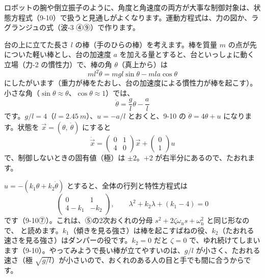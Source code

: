 \label{ph:波-4:sec10}
ロボットの腕や倒立振子のように、角度と角速度の両方が大事な制御対象は、状態方程式（9-10）で扱うと見通しがよくなります。運動方程式は、力の図か、ラグランジュの式（波-3 ④⑨）で作ります。

台の上に立てた長さ $l$ の棒（手のひらの棒）を考えます。棒を質量 $m$ の点が先についた軽い棒とし、台の加速度 $a$ を加える量とすると、台といっしょに動く立場（力-2 の慣性力）で、棒の角 $\theta$（真上から）は
\[ml^2\ddot\theta=mgl\sin\theta-mla\cos\theta\]
にしたがいます（重力が棒をたおし、台の加速度による慣性力が棒を起こす）。小さな角（$\sin\theta\approx\theta$、$\cos\theta\approx1$）では、
\[\ddot\theta=\frac{g}{l}\theta-\frac{a}{l}\]
です。$g/l=4$（$l=\qty{2.45}{m}$）、$u=-a/l$ とおくと、9-10 の $\ddot\theta=4\theta+u$ になります。状態を $\vec x=(\theta,\ \dot\theta)$ にすると
\[\dot{\vec x}=\begin{pmatrix}0&1\\4&0\end{pmatrix}\vec x+\begin{pmatrix}0\\1\end{pmatrix}u\]
で、制御しないときの固有値（極）は $\pm2$。$+2$ が右半分にあるので、たおれます。

$u=-(k_1\theta+k_2\dot\theta)$ とすると、全体の行列と特性方程式は
\[\begin{pmatrix}0&1\\4-k_1&-k_2\end{pmatrix},\qquad\lambda^2+k_2\lambda+(k_1-4)=0\]
です（9-10⑦）。これは、⑤の2次おくれの分母 $s^2+2\zeta\omega_{\mathrm n}s+\omega_{\mathrm n}^2$ と同じ形なので、
と読めます。$k_1$（傾きを見る強さ）は棒を起こすばねの役、$k_2$（たおれる速さを見る強さ）はダンパーの役です。$k_2=0$ だと $\zeta=0$ で、ゆれ続けてしまいます（9-10）。やってみようで長い棒が立てやすいのは、$g/l$ が小さく、たおれる速さ（極 $\sqrt{g/l}$）が小さいので、おくれのある人の目と手でも間に合うからです。

\begin{phflow}[倒立振子]
\end{phflow}

